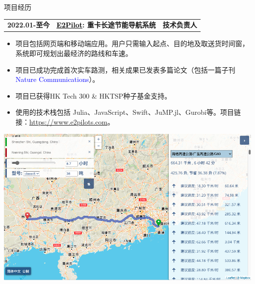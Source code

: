 \documentclass{resume} %
\makeatletter
\newcommand{\trianglebullet}{$\mbox{\ensuremath{\rhd}}$}
\newcommand{\projectheader}[3]{%
  \begin{tabular*}{\linewidth}{@{}l@{\extracolsep{\fill}}l@{\extracolsep{\fill}}r@{}}
    \textbf{#1} & \textbf{#2} & \textbf{#3} \\
  \end{tabular*}%
  \vspace{-0.5em} %
}
\makeatother
\begin{document}
\begin{rSection}{项目经历}
    \projectheader{2022.01-至今}{\href{https://www.e2pilots.com/}{\textcolor{black}{E2Pilot}}: 重卡长途节能导航系统}{技术负责人}

    \begin{minipage}[h]{0.65\textwidth} %
         \begin{itemize}
            \item 项目包括网页端和移动端应用。用户只需输入起点、目的地及取送货时间窗，系统即可规划出最经济的路线和车速。%
            \item 项目已成功完成首次实车路测，相关成果已发表多篇论文（包括一篇子刊 \textcolor{blue}{Nature Communications}）。
            \item 项目已获得HK Tech 300 \& HKTSP种子基金支持。
            \item 使用的技术栈包括 Julia、JavaScript、Swift、JuMP.jl、Gurobi等。项目链接：\href{https://www.e2pilots.com/}{https://www.e2pilots.com}。
        \end{itemize}
    \end{minipage}%
    \hfill %
    \begin{minipage}[h]{0.35\textwidth} %
        \centering
        \includegraphics[width=.80\textwidth]{e2pilot-web.png} %
    \end{minipage}



\end{rSection}
\end{document}
